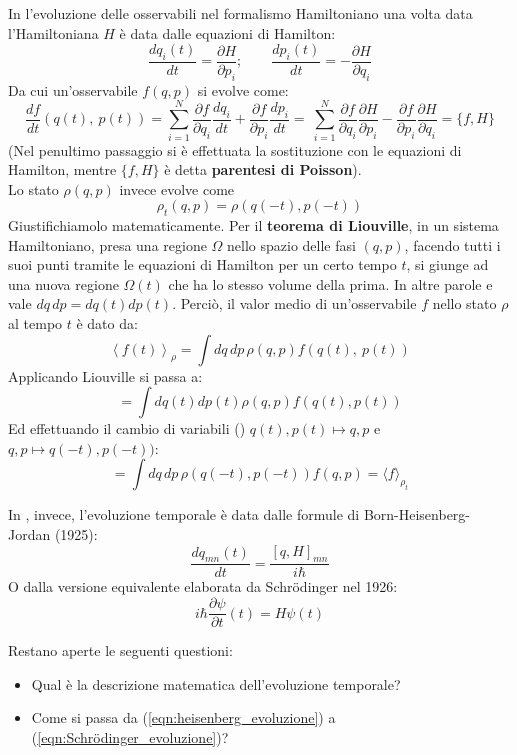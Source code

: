 \documentclass[FisicaTeorica.tex]{subfiles}
\begin{document}
In \textbf{\MC} l'evoluzione delle osservabili nel formalismo Hamiltoniano una volta data l'Hamiltoniana $H$ è data dalle equazioni di Hamilton:
\[
\frac{dq_i\left(t\right)}{dt}=\frac{\partial H}{\partial p_i};\quad \quad \frac{dp_i\left(t\right)}{dt}=-\frac{\partial H}{\partial q_i}
\]
Da cui un'osservabile $f(q,p)$ si evolve come:
\[
\frac{df}{dt}\left(q\left(t\right),\ p\left(t\right)\right)= \sum_{i=1}^{N}{\frac{\partial f}{\partial q_i}\frac{dq_i}{dt}+\frac{\partial f}{\partial p_i}\frac{dp_i}{dt}=\ \sum_{i=1}^{N}\frac{\partial f}{\partial q_i}\frac{\partial H}{\partial p_i}-\frac{\partial f}{\partial p_i}}\frac{\partial H}{\partial q_i}=\{f,H\}
\]
(Nel penultimo passaggio si è effettuata la sostituzione con le equazioni di Hamilton, mentre $\{f,H\}$ è detta \textbf{parentesi di Poisson}).\\
Lo stato $\rho(q,p)$ invece evolve come
\begin{equation}
\rho_t\left(q,p\right)=\rho(q\left(-t\right),p\left(-t\right))
\label{eqn:evoluzione_stati_MC}
\end{equation}
Giustifichiamolo matematicamente. Per il \textbf{teorema di Liouville}, in un sistema Hamiltoniano, presa una regione $\Omega$ nello spazio delle fasi $(q,p)$, facendo  tutti i suoi punti tramite le equazioni di Hamilton per un certo tempo $t$, si giunge ad una nuova regione $\Omega(t)$ che ha lo stesso volume della prima. In altre parole  e vale $dq\,dp=dq\left(t\right)dp(t)$. Perciò, il valor medio di un'osservabile $f$ nello stato $\rho$ al tempo $t$ è dato da:
\[ \left\langle f\left(t\right)\right\rangle_\rho=\int dq\,dp\, \rho\left(q,p\right)f\left(q\left(t\right),\ p\left(t\right)\right) \]
Applicando Liouville si passa a:
\[
=\int dq\left(t\right) dp\left(t\right)\rho\left(q,p\right)f\left(q\left(t\right),p\left(t\right)\right)
\]
Ed effettuando il cambio di variabili () $q\left(t\right),p\left(t\right)\mapsto q,p$ e $ q,p\mapsto q\left(-t\right),p(-t))$:
\[
= \int dq\, dp\, \rho(q(-t), p(-t))f(q,p) = \langle f\rangle_{\rho_t}
\]

In \textbf{\MQ}, invece, l'evoluzione temporale è data dalle formule di Born-Heisenberg-Jordan (1925):
\begin{equation}
    \frac{dq_{mn}\left(t\right)}{dt}=\frac{\left[q,H\right]_{mn}}{i\hbar}
    \label{eqn:heisenberg_evoluzione}
\end{equation}
O dalla versione equivalente elaborata da Schrödinger nel 1926:
\begin{equation}
i\hbar \frac{\partial \psi}{\partial t}(t) = H\psi(t)
    \label{eqn:Schrödinger_evoluzione}
\end{equation}

Restano aperte le seguenti questioni:
\begin{itemize}
    \item Qual è la descrizione matematica dell'evoluzione temporale?
    \item Come si passa da (\ref{eqn:heisenberg_evoluzione}) a (\ref{eqn:Schrödinger_evoluzione})?
\end{itemize}
\end{document}
